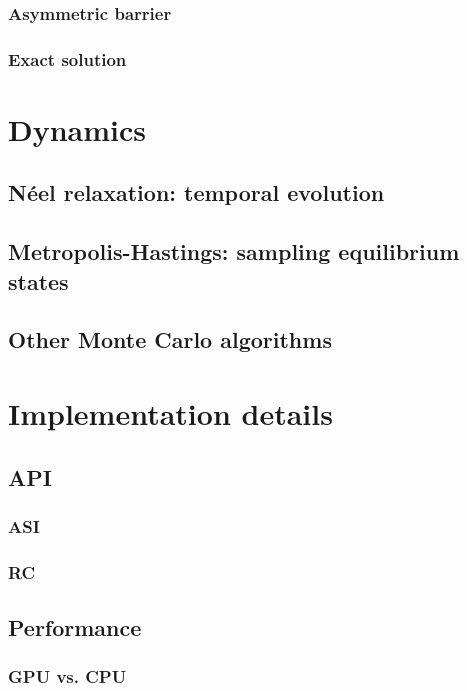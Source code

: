 \subsubsection{Asymmetric barrier}
\subsubsection{Exact solution} %

\section{Dynamics}
\subsection{N\'eel relaxation: temporal evolution}
\subsection{Metropolis-Hastings: sampling equilibrium states}
\subsection{Other Monte Carlo algorithms} %

\section{Implementation details}
\subsection{API} %
\subsubsection{ASI}
\subsubsection{RC}
\subsection{Performance} %
\subsubsection{GPU vs. CPU}
